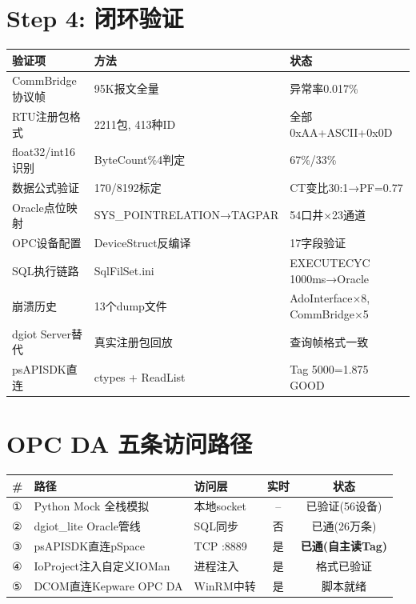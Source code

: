 \documentclass[12pt,a4paper]{ctexart}
\begin{document}
\section{Step 4: 闭环验证}

\begin{table}[H]\centering
\begin{tabular}{lll}
\toprule
\textbf{验证项} & \textbf{方法} & \textbf{状态} \\
\midrule
CommBridge协议帧 & 95K报文全量 & 异常率0.017\% \\
RTU注册包格式 & 2211包, 413种ID & 全部0xAA+ASCII+0x0D \\
float32/int16识别 & ByteCount\%4判定 & 67\%/33\% \\
数据公式验证 & 170/8192标定 & CT变比30:1→PF=0.77 \\
Oracle点位映射 & SYS\_POINTRELATION→TAGPAR & 54口井×23通道 \\
OPC设备配置 & DeviceStruct反编译 & 17字段验证 \\
SQL执行链路 & SqlFilSet.ini & EXECUTECYC 1000ms→Oracle \\
崩溃历史 & 13个dump文件 & AdoInterface×8, CommBridge×5 \\
dgiot Server替代 & 真实注册包回放 & 查询帧格式一致 \\
psAPISDK直连 & ctypes + ReadList & Tag 5000=1.875 GOOD \\
\bottomrule
\end{tabular}
\end{table}

\section{OPC DA 五条访问路径}

\begin{longtable}{lllcc}
\toprule
\textbf{\#} & \textbf{路径} & \textbf{访问层} & \textbf{实时} & \textbf{状态} \\
\midrule
① & Python Mock 全栈模拟 & 本地socket & -- & 已验证(56设备) \\
② & dgiot\_lite Oracle管线 & SQL同步 & 否 & 已通(26万条) \\
③ & psAPISDK直连pSpace & TCP :8889 & 是 & \textbf{已通(自主读Tag)} \\
④ & IoProject注入自定义IOMan & 进程注入 & 是 & 格式已验证 \\
⑤ & DCOM直连Kepware OPC DA & WinRM中转 & 是 & 脚本就绪 \\
\bottomrule
\end{longtable}
\end{document}
